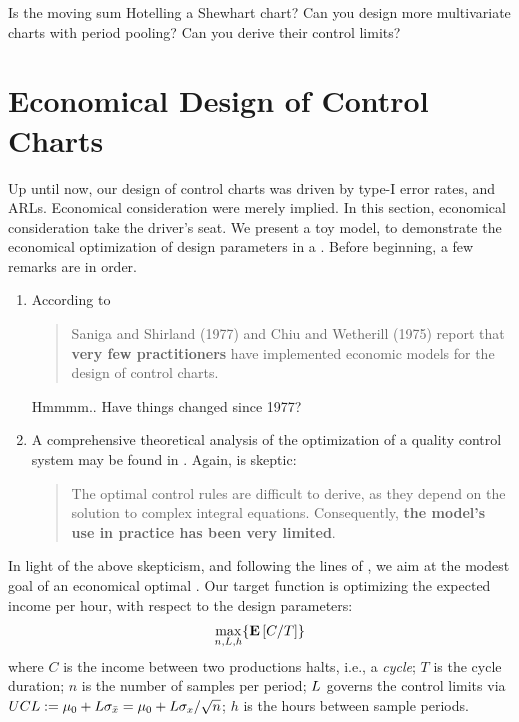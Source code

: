 \begin{think}
Is the moving sum Hotelling a Shewhart chart? 
Can you design more multivariate charts with period pooling? 
Can you derive their control limits?
\end{think}










\section{Economical Design of Control Charts}
\label{sec:economical_considerations}

Up until now, our design of control charts was driven by type-I error rates, and ARLs. 
Economical consideration were merely implied.
In this section, economical consideration take the driver's seat. 
We present a toy model, to demonstrate the economical optimization of design parameters in a \barxChart. 
Before beginning, a few remarks are in order. 

\begin{remark}
\noindent
\begin{enumerate}
\item According to \cite{montgomery_introduction_2007} 
\begin{quote}
Saniga and Shirland (1977) and Chiu and Wetherill (1975) report that \textbf{very few practitioners} have implemented economic models for the design of control charts.
\end{quote}
Hmmmm.. Have things changed since 1977?
\item A comprehensive theoretical analysis of the optimization of a quality control system may be found in \cite{girshick_bayes_1952}. Again, \cite{montgomery_introduction_2007} is skeptic:
\begin{quote}
The optimal control rules are difficult to derive, as they depend on the solution to complex integral equations. Consequently, \textbf{the model’s use in practice has been very limited}.
\end{quote}
\end{enumerate}
\end{remark}

In light of the above skepticism, and following the lines of \cite{duncan_economic_1956}, we aim at the modest goal of an economical optimal \barxChart. 
Our target function is optimizing the expected income per hour, with respect to the design parameters:
\begin{align}
\label{eq:optimal_design}
	\max_{n,L,h}\{ \mathbf{E}\left[ C/T \right] \}
\end{align}
where $C$ is the income between two productions halts, i.e., a \emph{cycle};
$T$ is the cycle duration;
$n$ is the number of samples per period;
$L$ governs the control limits via $UCL:= \mu_0+ L \sigma_{\bar{x}}= \mu_0+ L \sigma_x / \sqrt{n}$;
$h$ is the hours between sample periods. 

